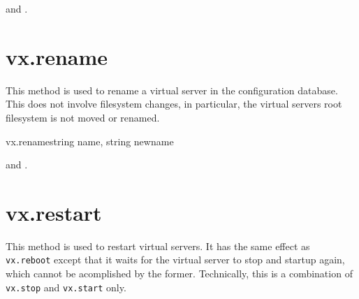 \begin{rpcaccess}
 and \rpcownerchecks.
\end{rpcaccess}

\rpcreturnnil

\begin{rpcerrors}
\end{rpcerrors}


\section{vx.rename}

This method is used to rename a virtual server in the configuration database.
This does not involve filesystem changes, in particular, the virtual servers
root filesystem is not moved or renamed.

\begin{rpcsynopsis}{vx.rename}{string name, string newname}
\end{rpcsynopsis}

\begin{rpcaccess}
 and \rpcownerchecks.
\end{rpcaccess}

\rpcreturnnil

\begin{rpcerrors}
\end{rpcerrors}


\section{vx.restart}

This method is used to restart virtual servers. It has the same effect as
\texttt{vx.reboot} except that it waits for the virtual server to stop and
startup again, which cannot be acomplished by the former. Technically, this is
a combination of \texttt{vx.stop} and \texttt{vx.start} only.

